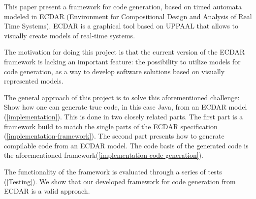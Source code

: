 This paper present a framework for code generation, based on timed automata
modeled in ECDAR (Environment for Compositional Design and Analysis of Real Time
Systems). ECDAR is a graphical tool based on UPPAAL that allows to visually
create models of real-time systems.

The motivation for doing this project is that the current version of the ECDAR
framework is lacking an important feature: the possibility to utilize models for
code generation, as a way to develop software solutions based on visually
represented models.

The general approach of this project is to solve this aforementioned challenge:
Show how one can generate true code, in this case Java, from an ECDAR model
(\ref{implementation}). This is done in two closely related parts. The first
part is a framework build to match the single parts of the ECDAR specification
(\ref{implementation-framework}). The second part presents how to generate
compilable code from an ECDAR model. The code basis of the generated code is
the aforementioned framework(\ref{implementation-code-generation}).

The functionality of the framework is evaluated through a series of tests
(\ref{Testing}). We show that our developed framework for code generation from
ECDAR is a valid approach.
